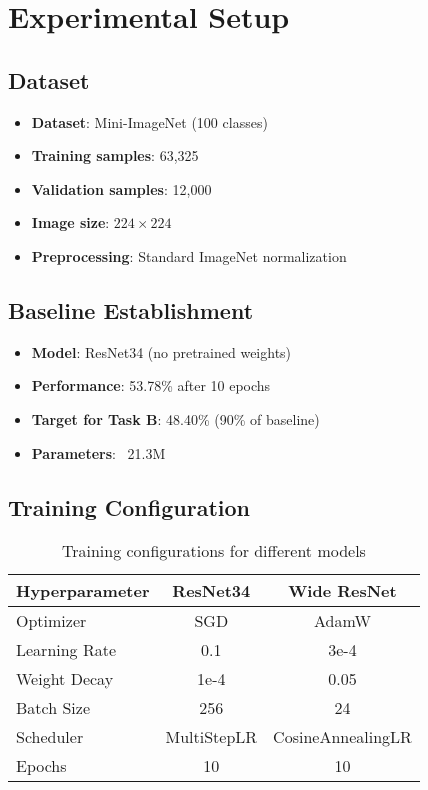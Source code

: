 \documentclass[11pt,a4paper]{article}
\begin{document}
\section{Experimental Setup}

\subsection{Dataset}
\begin{itemize}
    \item \textbf{Dataset}: Mini-ImageNet (100 classes)
    \item \textbf{Training samples}: 63,325
    \item \textbf{Validation samples}: 12,000
    \item \textbf{Image size}: $224 \times 224$
    \item \textbf{Preprocessing}: Standard ImageNet normalization
\end{itemize}

\subsection{Baseline Establishment}
\begin{itemize}
    \item \textbf{Model}: ResNet34 (no pretrained weights)
    \item \textbf{Performance}: 53.78\% after 10 epochs
    \item \textbf{Target for Task B}: 48.40\% (90\% of baseline)
    \item \textbf{Parameters}: ~21.3M
\end{itemize}

\subsection{Training Configuration}
\begin{table}[h]
\centering
\caption{Training configurations for different models}
\begin{tabular}{lcc}
\toprule
\textbf{Hyperparameter} & \textbf{ResNet34} & \textbf{Wide ResNet} \\
\midrule
Optimizer & SGD & AdamW \\
Learning Rate & 0.1 & 3e-4 \\
Weight Decay & 1e-4 & 0.05 \\
Batch Size & 256 & 24 \\
Scheduler & MultiStepLR & CosineAnnealingLR \\
Epochs & 10 & 10 \\
\bottomrule
\end{tabular}
\end{table}
\end{document}
